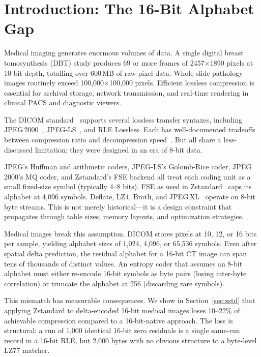 \documentclass[10pt,twocolumn]{article}
\begin{document}
\section{Introduction: The 16-Bit Alphabet Gap}
\label{sec:intro}

Medical imaging generates enormous volumes of data. A single digital breast tomosynthesis (DBT) study produces 69 or more frames of 2457$\times$1890 pixels at 10-bit depth, totalling over 600\,MB of raw pixel data. Whole slide pathology images routinely exceed 100,000$\times$100,000 pixels. Efficient lossless compression is essential for archival storage, network transmission, and real-time rendering in clinical PACS and diagnostic viewers.

The DICOM standard~\cite{dicom} supports several lossless transfer syntaxes, including JPEG\,2000~\cite{jpeg2000book}, JPEG-LS~\cite{jpegls}, and RLE Lossless. Each has well-documented tradeoffs between compression ratio and decompression speed~\cite{liu2017role,clunie2000lossless}. But all share a less-discussed limitation: they were designed in an era of 8-bit data.

JPEG's Huffman and arithmetic coders, JPEG-LS's Golomb-Rice coder, JPEG\,2000's MQ coder, and Zstandard's FSE backend all treat each coding unit as a small fixed-size symbol (typically 4--8 bits). FSE as used in Zstandard~\cite{zstd} caps its alphabet at 4,096 symbols. Deflate, LZ4, Brotli, and JPEG\,XL~\cite{jpegxl} operate on 8-bit byte streams. This is not merely historical---it is a design constraint that propagates through table sizes, memory layouts, and optimization strategies.

Medical images break this assumption. DICOM stores pixels at 10, 12, or 16 bits per sample, yielding alphabet sizes of 1,024, 4,096, or 65,536 symbols. Even after spatial delta prediction, the residual alphabet for a 16-bit CT image can span tens of thousands of distinct values. An entropy coder that assumes an 8-bit alphabet must either re-encode 16-bit symbols as byte pairs (losing inter-byte correlation) or truncate the alphabet at 256 (discarding rare symbols).

This mismatch has measurable consequences. We show in Section~\ref{sec:zstd} that applying Zstandard to delta-encoded 16-bit medical images loses 10--22\% of achievable compression compared to a 16-bit-native approach. The loss is structural: a run of 1,000 identical 16-bit zero residuals is a single same-run record in a 16-bit RLE, but 2,000 bytes with no obvious structure to a byte-level LZ77 matcher.
\end{document}
